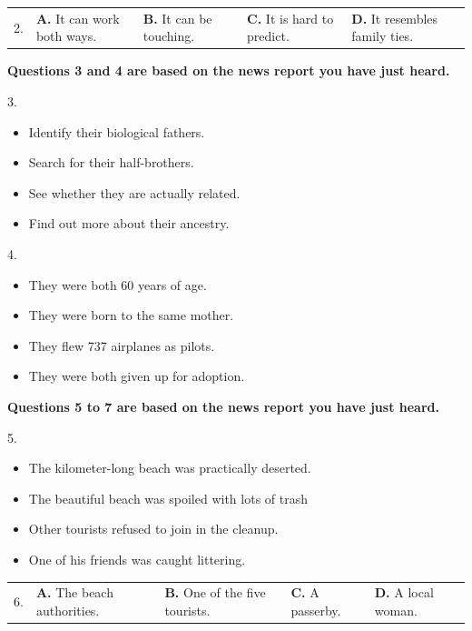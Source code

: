 \documentclass[UTF8,11pt]{ctexart}
\begin{document}
\noindent\begin{tabularx}{\linewidth}{@{}lXXXX@{}}2. & \textbf{A.} It can work both ways. & \textbf{B.} It can be touching. & \textbf{C.} It is hard to predict. & \textbf{D.} It resembles family ties.\\\end{tabularx}\par

\textbf{Questions 3 and 4 are based on the news report you have just heard.}


3.


\begin{itemize}[leftmargin=2em,itemsep=.2em,topsep=.4em]\item[A.] Identify their biological fathers.
\item[B.] Search for their half-brothers.
\item[C.] See whether they are actually related.
\item[D.] Find out more about their ancestry.
\end{itemize}

4.


\begin{itemize}[leftmargin=2em,itemsep=.2em,topsep=.4em]\item[A.] They were both 60 years of age.
\item[B.] They were born to the same mother.
\item[C.] They flew 737 airplanes as pilots.
\item[D.] They were both given up for adoption.
\end{itemize}

\textbf{Questions 5 to 7 are based on the news report you have just heard.}


5.


\begin{itemize}[leftmargin=2em,itemsep=.2em,topsep=.4em]\item[A.] The kilometer-long beach was practically deserted.
\item[B.] The beautiful beach was spoiled with lots of trash
\item[C.] Other tourists refused to join in the cleanup.
\item[D.] One of his friends was caught littering.
\end{itemize}

\noindent\begin{tabularx}{\linewidth}{@{}lXXXX@{}}6. & \textbf{A.} The beach authorities. & \textbf{B.} One of the five tourists. & \textbf{C.} A passerby. & \textbf{D.} A local woman.\\\end{tabularx}\par
\end{document}
